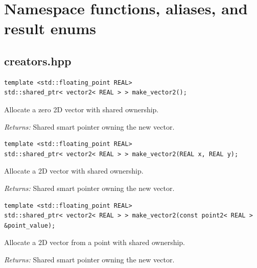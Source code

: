 \section{Namespace functions, aliases, and result enums}
\subsection{creators.hpp}
\par\noindent\begin{minipage}{\linewidth}
\begin{lstlisting}[style=apireference]
template <std::floating_point REAL>
std::shared_ptr< vector2< REAL > > make_vector2();
\end{lstlisting}
{\footnotesize Allocate a zero 2D vector with shared ownership.\par}
{\footnotesize\textit{Returns:} Shared smart pointer owning the new vector.\par}
\end{minipage}\par\vspace{1pt}
\par\noindent\begin{minipage}{\linewidth}
\begin{lstlisting}[style=apireference]
template <std::floating_point REAL>
std::shared_ptr< vector2< REAL > > make_vector2(REAL x, REAL y);
\end{lstlisting}
{\footnotesize Allocate a 2D vector with shared ownership.\par}
{\footnotesize\textit{Returns:} Shared smart pointer owning the new vector.\par}
\end{minipage}\par\vspace{1pt}
\par\noindent\begin{minipage}{\linewidth}
\begin{lstlisting}[style=apireference]
template <std::floating_point REAL>
std::shared_ptr< vector2< REAL > > make_vector2(const point2< REAL > &point_value);
\end{lstlisting}
{\footnotesize Allocate a 2D vector from a point with shared ownership.\par}
{\footnotesize\textit{Returns:} Shared smart pointer owning the new vector.\par}
\end{minipage}\par\vspace{1pt}
